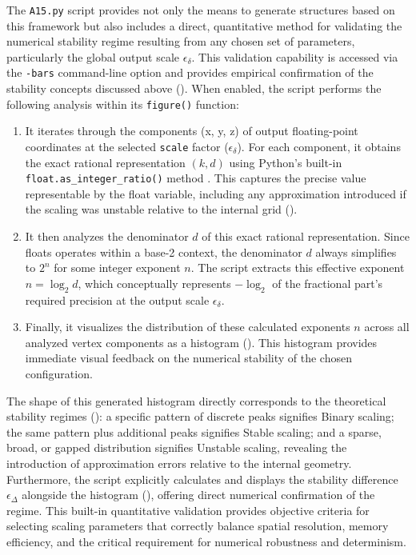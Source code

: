 \documentclass[10pt]{article}
\begin{document}
The \texttt{A15.py} script provides not only the means to generate structures based on this framework but also includes a direct, quantitative method for validating the numerical stability regime resulting from any chosen set of parameters, particularly the global output scale $\epsilon_\delta$. This validation capability is accessed via the \texttt{-bars} command-line option and provides empirical confirmation of the stability concepts discussed above (). When enabled, the script performs the following analysis within its \texttt{figure()} function:
\begin{enumerate}\itemsep0pt
    \item It iterates through the components (x, y, z) of output floating-point coordinates at the selected \texttt{scale} factor ($\epsilon_\delta$). For each component, it obtains the exact rational representation $(k, d)$ using Python's built-in \texttt{float.as\_integer\_ratio()} method \cite{PythonDocsFloatRatio}. This captures the precise value representable by the float variable, including any approximation introduced if the scaling was unstable relative to the internal grid ().
    \item It then analyzes the denominator $d$ of this exact rational representation. Since floats operates within a base-2 context, the denominator $d$ always simplifies to $2^n$ for some integer exponent $n$. The script extracts this effective exponent $n = \log_2 d$, which conceptually represents $-\log_2$ of the fractional part's required precision at the output scale $\epsilon_\delta$.
    \item Finally, it visualizes the distribution of these calculated exponents $n$ across all analyzed vertex components as a histogram (). This histogram provides immediate visual feedback on the numerical stability of the chosen configuration.
\end{enumerate}
The shape of this generated histogram directly corresponds to the theoretical stability regimes (): a specific pattern of discrete peaks signifies Binary scaling; the same pattern plus additional peaks signifies Stable scaling; and a sparse, broad, or gapped distribution signifies Unstable scaling, revealing the introduction of approximation errors relative to the internal geometry. Furthermore, the script explicitly calculates and displays the stability difference $\epsilon_\Delta$ alongside the histogram (), offering direct numerical confirmation of the regime. This built-in quantitative validation provides objective criteria for selecting scaling parameters that correctly balance spatial resolution, memory efficiency, and the critical requirement for numerical robustness and determinism.
\end{document}
